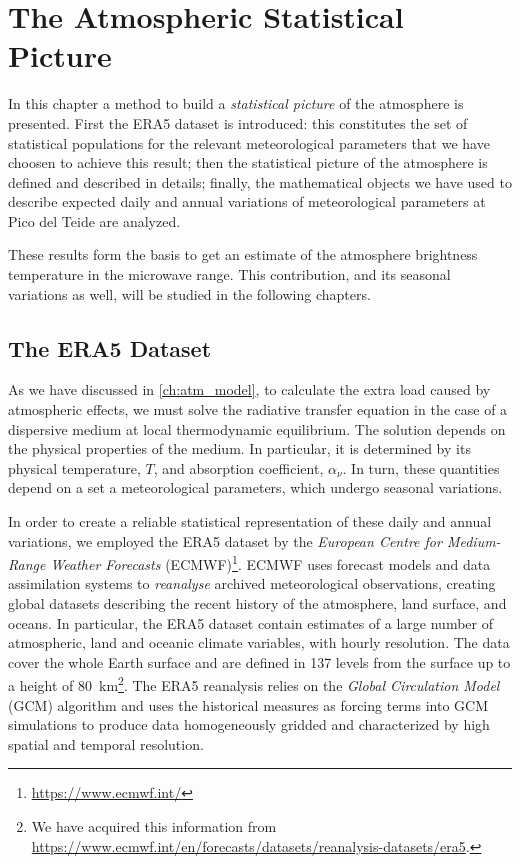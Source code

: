 \chapter{The Atmospheric Statistical Picture}\label{ch:statistical_picture}

In this chapter a method to build a \emph{statistical picture} of the
atmosphere is presented. First the ERA5 dataset is introduced: this
constitutes the set of statistical populations for the relevant meteorological
parameters that we have choosen to achieve this result; then the statistical
picture of the atmosphere is defined and described in details; finally,
the mathematical objects we have used to describe expected daily and annual
variations of meteorological parameters at Pico del Teide are analyzed.

These results form the basis to get an estimate of the atmosphere
brightness temperature in the microwave range. This contribution, and its
seasonal variations as well, will be studied in the following chapters.

\section{The ERA5 Dataset}

As we have discussed in \autoref{ch:atm_model}, to calculate the extra load
caused by atmospheric effects, we must solve the radiative transfer equation
in the case of a dispersive medium at local thermodynamic equilibrium. The
solution depends on the physical properties of the medium. In particular,
it is determined by its physical temperature, $T$, and absorption
coefficient, $\alpha_\nu$. In turn, these quantities depend on a set a
meteorological parameters, which undergo seasonal variations.

In order to create a reliable statistical representation of these daily and
annual variations, we employed the ERA5 dataset \autocite{hersbach2020era5}
by the \emph{European Centre for Medium-Range Weather Forecasts}
(ECMWF)\footnote{\url{https://www.ecmwf.int/}}. ECMWF uses forecast models
and data assimilation systems to \emph{reanalyse} archived meteorological
observations, creating global datasets describing the recent history of the
atmosphere, land surface, and oceans. In particular, the ERA5 dataset
contain estimates of a large number of atmospheric, land and oceanic
climate variables, with hourly resolution. The data cover the whole Earth
surface and are defined in \num{137} levels from the surface up to a height
of \SI{80}{\kilo\meter}\footnote{We have acquired this information from
\url{https://www.ecmwf.int/en/forecasts/datasets/reanalysis-datasets/era5}.}.
The ERA5 reanalysis relies on the \emph{Global Circulation Model} (GCM)
algorithm \autocite{mcguffie2014climate} and uses the historical measures
as forcing terms into GCM simulations to produce data homogeneously gridded
and characterized by high spatial and temporal resolution.

